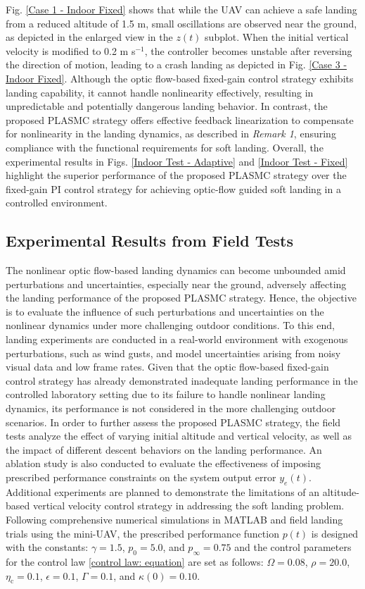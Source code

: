 \documentclass{IEEEtaes}
\begin{document}
Fig. \ref{Case 1 - Indoor Fixed} shows that while the UAV can achieve a safe landing from a reduced altitude of 1.5 m, small oscillations are observed near the ground, as depicted in the enlarged view in the $z(t)$ subplot.
When the initial vertical velocity is modified to 0.2 m s$^{-1}$, the controller becomes unstable after reversing the direction of motion, leading to a crash landing as depicted in Fig. \ref{Case 3 - Indoor Fixed}.
Although the optic flow-based fixed-gain control strategy exhibits landing capability, it cannot handle nonlinearity effectively, resulting in unpredictable and potentially dangerous landing behavior.
In contrast, the proposed PLASMC strategy offers effective feedback linearization to compensate for nonlinearity in the landing dynamics, as described in \textit{Remark 1}, ensuring compliance with the functional requirements for soft landing.
Overall, the experimental results in Figs. \ref{Indoor Test - Adaptive} and \ref{Indoor Test - Fixed} highlight the superior performance of the proposed PLASMC strategy over the fixed-gain PI control strategy for achieving optic-flow guided soft landing in a controlled environment. 

\subsection{Experimental Results from Field Tests} \label{outdoor tests results: section}
The nonlinear optic flow-based landing dynamics can become unbounded amid perturbations and uncertainties, especially near the ground, adversely affecting the landing performance of the proposed PLASMC strategy.
Hence, the objective is to evaluate the influence of such perturbations and uncertainties on the nonlinear dynamics under more challenging outdoor conditions.
To this end, landing experiments are conducted in a real-world environment with exogenous perturbations, such as wind gusts, and model uncertainties arising from noisy visual data and low frame rates.
Given that the optic flow-based fixed-gain control strategy has already demonstrated inadequate landing performance in the controlled laboratory setting due to its failure to handle nonlinear landing dynamics, its performance is not considered in the more challenging outdoor scenarios.
In order to further assess the proposed PLASMC strategy, the field tests analyze the effect of varying initial altitude and vertical velocity, as well as the impact of different descent behaviors on the landing performance.
An ablation study is also conducted to evaluate the effectiveness of imposing prescribed performance constraints on the system output error $y_e(t)$.
Additional experiments are planned to demonstrate the limitations of an altitude-based vertical velocity control strategy in addressing the soft landing problem.
Following comprehensive numerical simulations in MATLAB and field landing trials using the mini-UAV, the prescribed performance function $p(t)$ is designed with the constants: $\gamma = 1.5$, $p_0 = 5.0$, and $p_{\infty} = 0.75$ and the control parameters for the control law \eqref{control law: equation} are set as follows: $\Omega = 0.08$, $\rho = 20.0$, $\eta_{\text{c}} = 0.1$, $\epsilon = 0.1$, $\Gamma = 0.1$, and $\kappa(0) = 0.10$.
\end{document}
